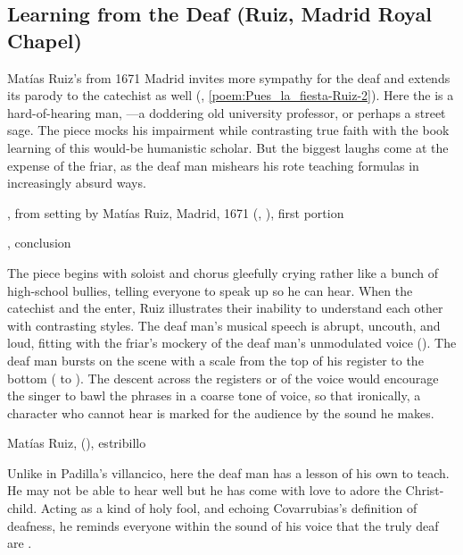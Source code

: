 \subsection{Learning from the Deaf (Ruiz, Madrid Royal Chapel)}

Matías Ruiz's  from 1671 Madrid invites more
sympathy for the deaf and extends its parody to the catechist as well
(, \ref{poem:Pues_la_fiesta-Ruiz-2}).
Here the  is a hard-of-hearing man, ---a doddering old university professor, or perhaps a street
sage.
The piece mocks his impairment while contrasting true faith with the book
learning of this would-be humanistic scholar.
But the biggest laughs come at the expense of the friar, as the deaf man
mishears his rote teaching formulas in increasingly absurd ways.


{, from setting by
Matías Ruiz, Madrid, 1671 (, ), first
portion}

{, conclusion}

The piece begins with soloist and chorus gleefully crying  rather like a bunch of high-school bullies, telling everyone to speak
up so he can hear.
When the catechist and the  enter, Ruiz illustrates their inability
to understand each other with contrasting styles.
The deaf man's musical speech is abrupt, uncouth, and loud, fitting with the
friar's mockery of the deaf man's unmodulated voice
().
The deaf man bursts on the scene with a scale from the top of his register to
the bottom ( to ).
The descent across the registers or  of the voice would encourage
the singer to bawl the phrases in a coarse tone of voice, so that ironically, a
character who cannot hear is marked for the audience by the sound he makes.

{Matías Ruiz, 
(), estribillo} 

Unlike in Padilla's villancico, here the deaf man has a lesson of his own to
teach.
He may not be able to hear well but he has come with love to adore the
Christ-child.
Acting as a kind of holy fool, and echoing Covarrubias's definition of deafness,
he reminds everyone within the sound of his voice that the truly deaf are
.

